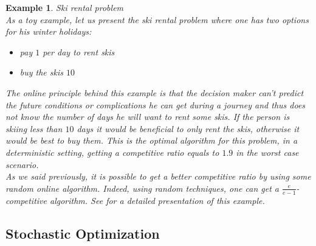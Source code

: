 \documentclass[a4paper]{book}
\newtheorem{ex}{Example}[chapter]
\begin{document}
\begin{ex}
Ski rental problem\\
As a toy example, let us present the {\sc ski rental} problem where one has two options for his winter holidays: 
\begin{itemize}
    \item pay $1$ per day to rent skis
    \item buy the skis $10$
\end{itemize}
The online principle behind this example is that the decision maker can't predict the future conditions or complications he can get during a journey and thus does not know the number of days he will want to rent some skis. If the person is skiing less than $10$ days it would be beneficial to only rent the skis, otherwise it would be best to buy them. This is the optimal algorithm for this problem, in a deterministic setting, getting a competitive ratio equals to $1.9$ in the worst case scenario.  \\
As we said previously, it is possible to get a better competitive ratio by using some random \emph{online} algorithm. Indeed, using random techniques, one can get a $\frac{e}{e-1}$-competitive algorithm. See \cite{KarlinMMO90} for a detailed presentation of this example. 
\end{ex}


\subsection{Stochastic Optimization}
\end{document}
